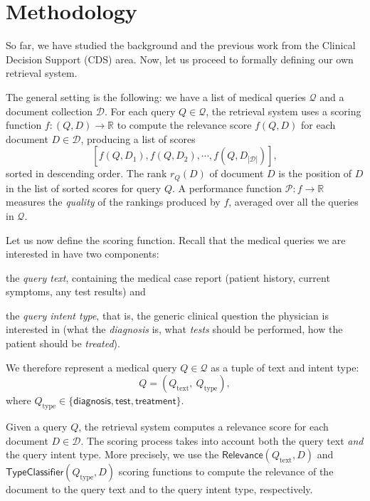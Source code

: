 \chapter{Methodology}\label{meth}

So far, we have studied the background and the previous work from the Clinical Decision Support (CDS) area.
Now, let us proceed to formally defining our own retrieval system.

The general setting is the following: we have a list of medical queries $\mathcal{Q}$ and a document collection $\mathcal{D}$.
For each query $Q \in \mathcal{Q}$,
the retrieval system uses a scoring function $f:(Q,D)\rightarrow\mathbb{R}$ to compute the relevance score $f(Q,D)$
for each
document $D\in\mathcal{D}$, producing a list of scores \[[f(Q,D_1), f(Q,D_2), \cdots, f(Q,D_{|\mathcal{D}|})],\]
sorted in descending order.
The rank $r_Q(D)$ of document $D$ is the position of $D$ in the list of sorted scores for query $Q$.
A performance function $\mathcal{P}:f\rightarrow\mathbb{R}$ measures the \emph{quality} of the rankings produced by
$f$, averaged over all the queries in $ \mathcal{Q}$.

Let us now define the scoring function.
Recall that the medical queries we are interested in have two components:
\begin{enumerate*}[label=\arabic*)]
 \item the \emph{query text}, containing the medical case report (patient history, current symptoms, any test results) and
 \item the \emph{query intent type}, that is, the generic clinical question the physician is interested in
 (what the \emph{diagnosis} is, what \emph{tests} should be performed, how the patient should be \emph{treated}).
\end{enumerate*}
We therefore represent a medical query $Q\in\mathcal{Q}$ as a tuple of text and intent type: \[Q = \left(Q_{\text{text}},\ Q_{\text{type}}\right),\]
where $Q_{\text{type}} \in \{\textsf{diagnosis}, \textsf{test}, \textsf{treatment}\}$.

Given a query $Q$, the retrieval system computes a relevance score for each document $D\in\mathcal{D}$.
The scoring process takes into account both the query text \emph{and} the query intent type.
More precisely, we use the
$\textsf{Relevance}(Q_{\text{text}}, D)$ and $\textsf{TypeClassifier}(Q_{\text{type}}, D)$
scoring functions to compute the relevance of the document to the query text and to the query intent type, respectively.

